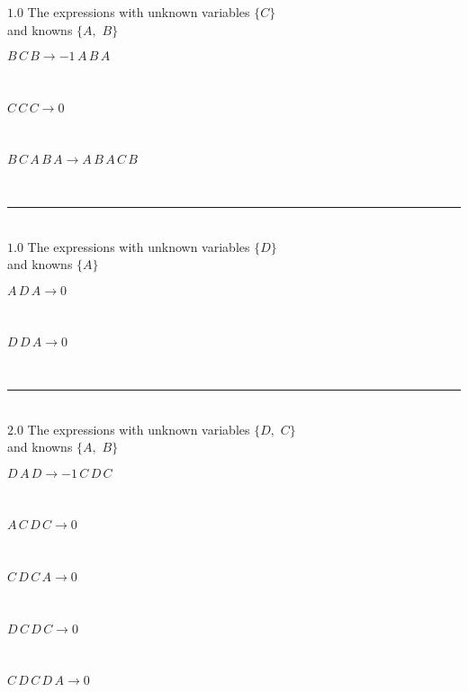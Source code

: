 \documentclass[rep10,leqno]{report}
\begin{document}
$1.0$  The expressions with unknown variables $\{C\}$\\
and knowns $\{A,
$ $
B\}$\smallskip\\
\begin{minipage}{6in}
$
B\,
 C\,
 B\rightarrow -1\,
 A\,
 B\,
 A
$
\end{minipage}\medskip \\
\begin{minipage}{6in}
$
C\,
 C\,
 C\rightarrow 0
$
\end{minipage}\medskip \\
\begin{minipage}{6in}
$
B\,
 C\,
 A\,
 B\,
 A\rightarrow A\,
 B\,
 A\,
 C\,
 B
$
\end{minipage}\\
\rule[3pt]{6in}{.7pt}\\
$1.0$  The expressions with unknown variables $\{D\}$\\
and knowns $\{A\}$\smallskip\\
\begin{minipage}{6in}
$
A\,
 D\,
 A\rightarrow 0
$
\end{minipage}\medskip \\
\begin{minipage}{6in}
$
D\,
 D\,
 A\rightarrow 0
$
\end{minipage}\\
\rule[3pt]{6in}{.7pt}\\
$2.0$  The expressions with unknown variables $\{D,
$ $
C\}$\\
and knowns $\{A,
$ $
B\}$\smallskip\\
\begin{minipage}{6in}
$
D\,
 A\,
 D\rightarrow -1\,
 C\,
 D\,
 C
$
\end{minipage}\medskip \\
\begin{minipage}{6in}
$
A\,
 C\,
 D\,
 C\rightarrow 0
$
\end{minipage}\medskip \\
\begin{minipage}{6in}
$
C\,
 D\,
 C\,
 A\rightarrow 0
$
\end{minipage}\medskip \\
\begin{minipage}{6in}
$
D\,
 C\,
 D\,
 C\rightarrow 0
$
\end{minipage}\medskip \\
\begin{minipage}{6in}
$
C\,
 D\,
 C\,
 D\,
 A\rightarrow 0
$
\end{minipage}\medskip \\
\end{document}
